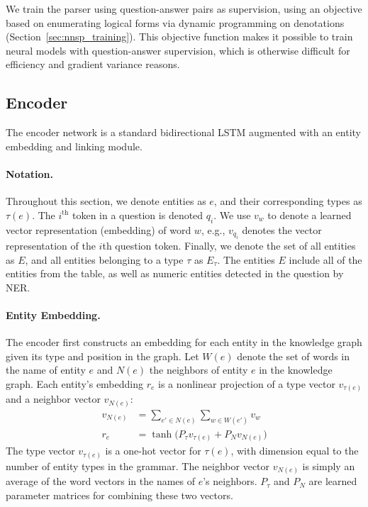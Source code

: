 We train the parser using question-answer pairs as supervision, using an 
objective based on enumerating logical forms via dynamic programming on 
denotations \citep{pasupat2016inferring} (Section~\ref{sec:nnsp_training}). This 
objective function makes it possible to train neural models with 
question-answer supervision, which is otherwise difficult for efficiency and 
gradient variance reasons.

\subsection{Encoder}
\label{sec:nnsp_encoder}

The encoder network is a standard bidirectional LSTM augmented with an entity 
embedding and linking module.

\paragraph{Notation.}
Throughout this section, we denote entities as $e$, and their corresponding 
types as $\tau(e)$. The $i^{\text{th}}$ token in a question is denoted $q_i$. 
We use $v_w$ to denote a learned vector representation (embedding) of word $w$, 
e.g., $v_{q_i}$ denotes the vector representation of the $i$th question token. 
Finally, we denote the set of all entities as $E$, and all entities belonging 
to a type $\tau$ as $E_{\tau}$. The entities $E$ include all of the entities 
from the table, as well as numeric entities detected in the question by NER. 

\paragraph{Entity Embedding.}
The encoder first constructs an embedding for each entity in the knowledge 
graph given its type and position in the graph. 
Let $W(e)$ denote the set of words in the name of entity $e$ and $N(e)$ the 
neighbors of entity $e$ in the knowledge graph.
Each entity's embedding $r_e$ is a nonlinear projection of a type vector 
$v_{\tau(e)}$ and a neighbor vector $v_{N(e)}$:
\begin{align}
    v_{N(e)} &= \sum_{e' \in N(e)}\sum_{w \in W(e')}v_w \\
    r_e &= \tanh\big(P_\tau v_{\tau(e)} + P_N v_{N(e)}\big)
\end{align}
The type vector $v_{\tau(e)}$ is a one-hot vector for $\tau(e)$, with dimension 
equal to the number of entity types in the grammar. The neighbor vector 
$v_{N(e)}$ is simply an average of the word vectors in the names of $e$'s 
neighbors. $P_\tau$ and $P_N$ are learned parameter matrices for combining 
these two vectors.

